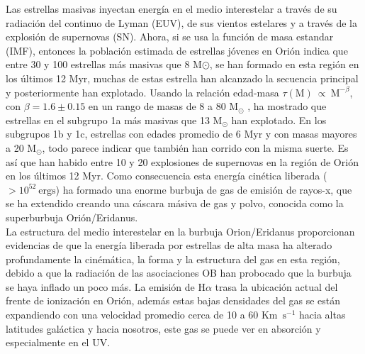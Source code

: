 \documentclass{article}
\newcommand\ha{\ensuremath{\mathrm{H}\alpha}}
\begin{document}
Las estrellas masivas inyectan energía en el medio interestelar a través de su radiación del continuo de Lyman (EUV), de sus vientos estelares y a través de la explosión de supernovas (SN). Ahora, si se usa la función de masa estandar (IMF), entonces la población estimada de estrellas jóvenes en Orión indica que entre 30 y 100 estrellas más masivas que 8 M\(\odot\), se han formado en esta región en los últimos 12 Myr, muchas de estas estrella han alcanzado la secuencia principal y posteriormente han explotado. Usando la relación edad-masa \(\tau(\text{M})~\propto~\text{M}^{-\beta}\), con \(\beta = 1.6 \pm 0.15\) en un rango de masas de 8 a 80 \(\text{M}_{\odot}\) \citep{Shull:1995}, ha mostrado que estrellas en el subgrupo 1a más masivas que 13 \(\text{M}_{\odot}\) han explotado. En los subgrupos 1b y 1c, estrellas con edades promedio de 6 Myr y con masas mayores a 20 \(\text{M}_{\odot}\), todo parece indicar que también han corrido con la misma suerte. Es así que han habido entre 10 y 20 explosiones de supernovas en la región de Orión en los últimos 12 Myr. Como consecuencia esta energía cinética liberada (\(>10^{52}~\text{ergs}\)) ha formado una enorme burbuja de gas de emisión de rayos-x, que se ha extendido creando una cáscara másiva de gas y polvo, conocida como la superburbuja Orión/Eridanus.\\

La estructura del medio interestelar en la  burbuja Orion/Eridanus proporcionan evidencias de que la energía liberada por estrellas de alta masa ha alterado profundamente la cinémática, la forma y la estructura del gas en esta región, debido a que la radiación de las asociaciones OB han probocado que la burbuja se haya inflado un poco más. La emisión de \ha{} trasa la ubicación actual del frente de ionización en Orión, además estas bajas densidades del gas se están expandiendo con una velocidad promedio cerca de 10 a 60 Km~\(\text{s}^{-1}\) hacia altas latitudes galáctica y hacia nosotros, este gas se puede ver en absorción y especialmente en el UV.\\
         
\end{document}

